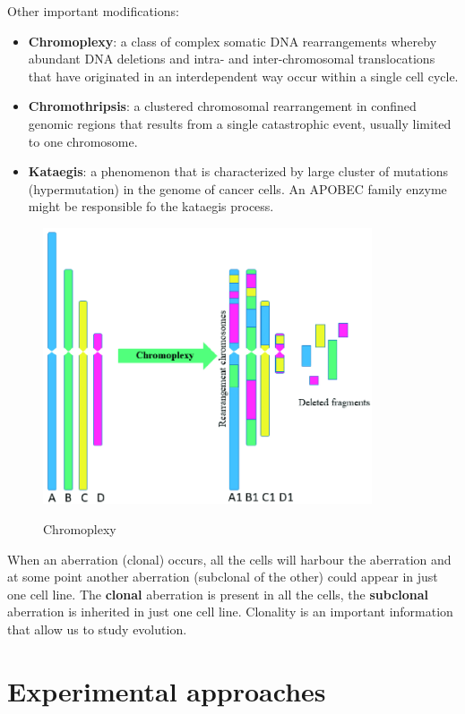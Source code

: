 Other important modifications:

\begin{itemize}
  \item \textbf{Chromoplexy}: a class of complex somatic DNA rearrangements
  whereby abundant DNA deletions and intra- and inter-chromosomal translocations
  that have originated in an interdependent way occur within a single cell
  cycle.

  \item \textbf{Chromothripsis}: a clustered chromosomal rearrangement in
  confined genomic regions that results from a single catastrophic event,
  usually limited to one chromosome.

  \item \textbf{Kataegis}: a phenomenon that is characterized by large cluster
  of mutations (hypermutation) in the genome of cancer cells. An APOBEC family
  enzyme might be responsible fo the kataegis process.
\end{itemize}
  
\begin{figure}[H]
  \includegraphics[width=3.81944in,height=3.21433in]{image8.png}\\
  \centering
  \caption{Chromoplexy}
  \label{fig: Chromoplexy}
\end{figure}


When an aberration (clonal) occurs, all the cells will harbour the aberration
and at some point another aberration (subclonal of the other) could appear in
just one cell line. The \textbf{clonal} aberration is present in all the cells,
the \textbf{subclonal} aberration is inherited in just one cell line. Clonality
is an important information that allow us to study evolution.


\hypertarget{experimental-approaches}{%
\section{Experimental approaches}\label{experimental-approaches}}


